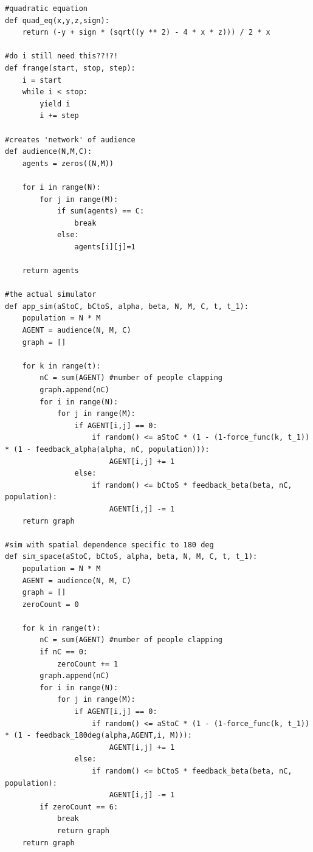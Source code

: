 \begin{lstlisting}
#quadratic equation    
def quad_eq(x,y,z,sign):
    return (-y + sign * (sqrt((y ** 2) - 4 * x * z))) / 2 * x

#do i still need this??!?!
def frange(start, stop, step):
    i = start
    while i < stop:
        yield i
        i += step
   
#creates 'network' of audience        
def audience(N,M,C):
    agents = zeros((N,M))
    
    for i in range(N):
        for j in range(M):
            if sum(agents) == C:
                break
            else:
                agents[i][j]=1
    
    return agents

#the actual simulator            
def app_sim(aStoC, bCtoS, alpha, beta, N, M, C, t, t_1):
    population = N * M
    AGENT = audience(N, M, C)
    graph = []

    for k in range(t):
        nC = sum(AGENT) #number of people clapping
        graph.append(nC)
        for i in range(N):
            for j in range(M):
                if AGENT[i,j] == 0:
                    if random() <= aStoC * (1 - (1-force_func(k, t_1)) * (1 - feedback_alpha(alpha, nC, population))):
                        AGENT[i,j] += 1
                else:
                    if random() <= bCtoS * feedback_beta(beta, nC, population):
                        AGENT[i,j] -= 1
    return graph

#sim with spatial dependence specific to 180 deg
def sim_space(aStoC, bCtoS, alpha, beta, N, M, C, t, t_1):
    population = N * M
    AGENT = audience(N, M, C)
    graph = []
    zeroCount = 0

    for k in range(t):
        nC = sum(AGENT) #number of people clapping
        if nC == 0:
            zeroCount += 1
        graph.append(nC)
        for i in range(N):
            for j in range(M):
                if AGENT[i,j] == 0:
                    if random() <= aStoC * (1 - (1-force_func(k, t_1)) * (1 - feedback_180deg(alpha,AGENT,i, M))):
                        AGENT[i,j] += 1
                else:
                    if random() <= bCtoS * feedback_beta(beta, nC, population):
                        AGENT[i,j] -= 1
        if zeroCount == 6:
            break
            return graph
    return graph
 

\end{lstlisting}

